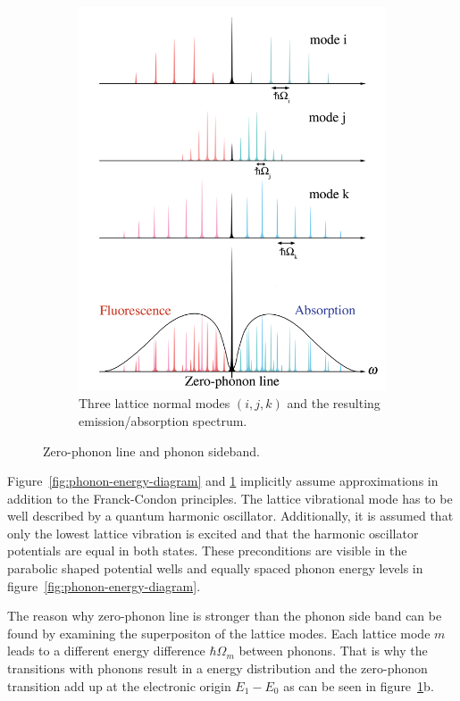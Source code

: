 \begin{figure}[H]
\begin{subfigure}[b]{0.48\textwidth}
		\includegraphics[width=\textwidth]{figures/quantum-dot/Lattice-modes}
		\caption{Three lattice normal modes $(i, j, k)$ and the resulting emission/absorption spectrum.\\}
		\label{fig:lattice-modes}
	\end{subfigure}
	\caption{Zero-phonon line and phonon sideband.~\cite{noauthor_zero-phonon_nodate}}
	\label{fig:zero-phonon-line-phonon-side-band}
\end{figure}
Figure~\ref{fig:phonon-energy-diagram} and \ref{fig:lattice-modes} implicitly assume approximations in addition to the Franck-Condon principles.
The lattice vibrational mode has to be well described by a quantum harmonic oscillator.
Additionally, it is assumed that only the lowest lattice vibration is excited and that the harmonic oscillator potentials are equal in both states.
These preconditions are visible in the parabolic shaped potential wells and equally spaced phonon energy levels in figure~\ref{fig:phonon-energy-diagram}.

The reason why zero-phonon line is stronger than the phonon side band can be found by examining the superpositon of the lattice modes.
Each lattice mode $m$ leads to a different energy difference $\hbar \Omega_m$ between phonons.
That is why the transitions with phonons result in a energy distribution and the zero-phonon transition add up at the electronic origin $E_1 - E_0$ as can be seen in figure~\ref{fig:lattice-modes}b.

